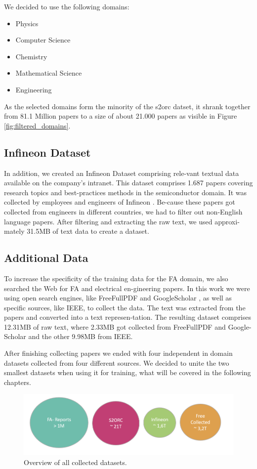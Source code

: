 We decided to use the following domains:
\begin{itemize}
	\item Physics
	\item Computer Science
	\item Chemistry
	\item Mathematical Science
	\item Engineering
\end{itemize}

As the selected domains form the minority of the s2orc datset, it shrank together from 81.1 Million papers to a size of about 21.000 papers as visible in Figure \ref{fig:filtered_domains}.

\subsection{Infineon Dataset}
In addition, we created an Infineon Dataset comprising rele-vant textual data available on the company’s intranet. This dataset comprises 1.687 papers covering research topics and best-practices methods in the semiconductor domain. It was collected by employees and engineers of Infineon . Be-cause these papers got collected from engineers in different countries, we had to filter out non-English language papers. After filtering and extracting the raw text, we used approxi-mately 31.5MB of text data to create a dataset.

\subsection{Additional Data}
To increase the specificity of the training data for the FA domain, we also searched the Web for FA and electrical en-gineering papers. In this work we were using open search engines, like FreeFullPDF  and GoogleScholar , as well as specific sources, like IEEE, to collect the data. The text was extracted from the papers and converted into a text represen-tation. The resulting dataset comprises 12.31MB of raw text, where 2.33MB got collected from FreeFullPDF and Google-Scholar and the other 9.98MB from IEEE.



After finishing collecting papers we ended with four independent in domain datasets collected from four different sources. We decided to unite the two smallest datasets when using it for training, what will be covered in the following chapters.
\begin{figure}[H]
	\centering
	\includegraphics[width=1\textwidth]{figures/datasets.PNG}
	\caption{Overview of all collected datasets.}
	\label{fig:datasets}
\end{figure}

